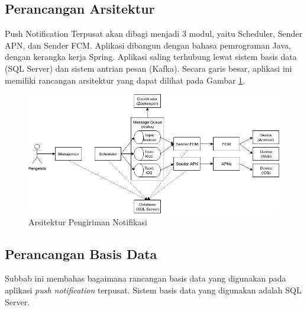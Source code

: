 \subsection{Perancangan Arsitektur} \label{s:perancangan_arsitektur}
\par Push Notification Terpusat akan dibagi menjadi 3 modul, yaitu Scheduler, Sender APN, dan Sender FCM. Aplikasi dibangun dengan bahasa pemrograman Java, dengan kerangka kerja Spring. Aplikasi saling terhubung lewat sistem basis data (SQL Server) dan sistem antrian pesan (Kafka). Secara garis besar, aplikasi ini memiliki rancangan arsitektur yang dapat dilihat pada Gambar \ref{f:arsitektur_aplikasi}.
\begin{figure}[H]
	\caption{Arsitektur Pengiriman Notifikasi} \label{f:arsitektur_aplikasi}
    \includegraphics[width=1\textwidth]{bab3/figures/arsitektur_pengiriman_notifikasi.jpg}
\end{figure}

\subsection{Perancangan Basis Data}
\par Subbab ini membahas bagaimana rancangan basis data yang digunakan pada aplikasi \textit{push notification} terpusat. Sistem basis data yang digunakan adalah SQL Server.

